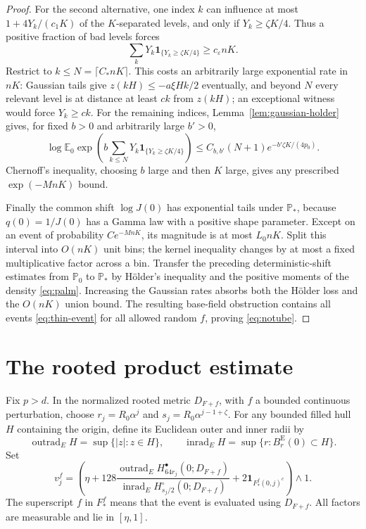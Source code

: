\documentclass[11pt,reqno]{amsart}
\theoremstyle{plain}
\theoremstyle{definition}
\theoremstyle{remark}
\newcommand{\E}{\mathbb E}
\newcommand{\Pp}{\mathbb P}
\newcommand{\inrad}{\operatorname{inrad}}
\newcommand{\outrad}{\operatorname{outrad}}
\newcommand{\1}{\mathbf{1}}
\newcommand{\Be}{B^{\mathrm E}}
\begin{document}
\begin{proof}
For the second alternative, one index $k$ can influence at most $1+4Y_k/(c_1K)$ of the $K$-separated levels, and only if $Y_k\ge\zeta K/4$. Thus a positive fraction of bad levels forces
\[
\sum_kY_k\1_{\{Y_k\ge\zeta K/4\}}\ge c_\varepsilon nK.
\]
Restrict to $k\le N=\lceil C_*nK\rceil$. This costs an arbitrarily large exponential rate in $nK$: Gaussian tails give $z(kH)\le-a\xi Hk/2$ eventually, and beyond $N$ every relevant level is at distance at least $ck$ from $z(kH)$; an exceptional witness would force $Y_k\ge ck$. For the remaining indices, Lemma~\ref{lem:gaussian-holder} gives, for fixed $b>0$ and arbitrarily large $b'>0$,
\[
\log\E_0\exp\left(b\sum_{k\le N}Y_k\1_{\{Y_k\ge\zeta K/4\}}\right)
\le C_{b,b'}(N+1)e^{-b'\zeta K/(4p_0)}.
\]
Chernoff's inequality, choosing $b$ large and then $K$ large, gives any prescribed $\exp(-MnK)$ bound.

Finally the common shift $\log J(0)$ has exponential tails under $\Pp_*$, because $q(0)=1/J(0)$ has a Gamma law with a positive shape parameter. Except on an event of probability $Ce^{-MnK}$, its magnitude is at most $L_0nK$. Split this interval into $O(nK)$ unit bins; the kernel inequality changes by at most a fixed multiplicative factor across a bin. Transfer the preceding deterministic-shift estimates from $\Pp_0$ to $\Pp_*$ by H\"older's inequality and the positive moments of the density \eqref{eq:palm}. Increasing the Gaussian rates absorbs both the H\"older loss and the $O(nK)$ union bound. The resulting base-field obstruction contains all events \eqref{eq:thin-event} for all allowed random $f$, proving \eqref{eq:notube}.
\end{proof}

\section{The rooted product estimate}\label{sec:product}
Fix $p>d$. In the normalized rooted metric $D_{F+f}$, with $f$ a bounded continuous perturbation, choose $r_j=R_0\alpha^j$ and $s_j=R_0\alpha^{j-1+\zeta}$. For any bounded filled hull $H$ containing the origin, define its Euclidean outer and inner radii by
\[
\outrad_E H=\sup\{|z|:z\in H\},\qquad
\inrad_E H=\sup\{r:\Be_r(0)\subset H\}.
\]
Set
\begin{equation}\label{eq:v-weights}
v_j^f=\left(\eta+128\frac{\outrad_E H_{64r_j}^\bullet(0;D_{F+f})}
{\inrad_E H_{s_j/2}^\circ(0;D_{F+f})}
+2\1_{F_*^f(0,j)^c}\right)\wedge1.
\end{equation}
The superscript $f$ in $F_*^f$ means that the event is evaluated using $D_{F+f}$. All factors are measurable and lie in $[\eta,1]$.
\end{document}
